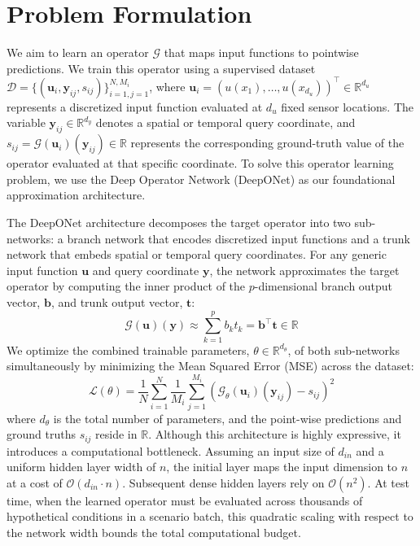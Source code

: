 \documentclass{iopjournal}
\begin{document}
\section{Problem Formulation}
\label{sec:problemformulation}

We aim to learn an operator $\mathcal{G}$ that maps input functions to pointwise predictions. We train this operator using a supervised dataset $\mathcal{D}=\{(\mathbf{u}_{i},\mathbf{y}_{ij},s_{ij})\}_{i=1,j=1}^{N,M_{i}}$, where $\mathbf{u}_{i}=(u(x_{1}),\dots,u(x_{d_u}))^{\top}\in\mathbb{R}^{d_u}$ represents a discretized input function evaluated at $d_u$ fixed sensor locations. The variable $\mathbf{y}_{ij}\in\mathbb{R}^{d_{y}}$ denotes a spatial or temporal query coordinate, and $s_{ij}=\mathcal{G}(\mathbf{u}_{i})(\mathbf{y}_{ij})\in\mathbb{R}$ represents the corresponding ground-truth value of the operator evaluated at that specific coordinate. To solve this operator learning problem, we use the Deep Operator Network (DeepONet) \cite{lu2021deeponet, lu2022deeponetcomparison, lu2022multifidelitydeeponet, lin2023responsedeeponet} as our foundational approximation architecture.

The DeepONet architecture decomposes the target operator into two sub-networks: a branch network that encodes discretized input functions and a trunk network that embeds spatial or temporal query coordinates. For any generic input function $\mathbf{u}$ and query coordinate $\mathbf{y}$, the network approximates the target operator by computing the inner product of the $p$-dimensional branch output vector, $\mathbf{b}$, and trunk output vector, $\mathbf{t}$:
\[\mathcal{G}(\mathbf{u})(\mathbf{y}) \approx \sum_{k=1}^{p} b_{k}t_{k} = \mathbf{b}^\top\mathbf{t} \in \mathbb{R}\]
We optimize the combined trainable parameters, $\theta \in \mathbb{R}^{d_\theta}$, of both sub-networks simultaneously by minimizing the Mean Squared Error (MSE) across the dataset:
\[\mathcal{L}(\theta) = \frac{1}{N} \sum_{i=1}^{N} \frac{1}{M_{i}} \sum_{j=1}^{M_{i}} (\mathcal{G}_{\theta}(\mathbf{u}_{i})(\mathbf{y}_{ij}) - s_{ij})^{2}\]
where $d_\theta$ is the total number of parameters, and the point-wise predictions and ground truths $s_{ij}$ reside in $\mathbb{R}$. Although this architecture is highly expressive, it introduces a computational bottleneck. Assuming an input size of $d_{in}$ and a uniform hidden layer width of $n$, the initial layer maps the input dimension to $n$ at a cost of $\mathcal{O}(d_{in} \cdot n)$. Subsequent dense hidden layers rely on $\mathcal{O}(n^{2})$. At test time, when the learned operator must be evaluated across thousands of hypothetical conditions in a scenario batch, this quadratic scaling with respect to the network width bounds the total computational budget.
\end{document}
